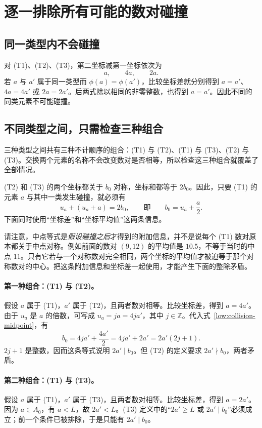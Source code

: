 \documentclass[UTF8,a4paper,oneside,openany,fontset=fandol,zihao=-4]{ctexbook}
\theoremstyle{guide}
\newcommand{\Z}{\mathbb Z}
\begin{document}
\section{逐一排除所有可能的数对碰撞}

\subsection{同一类型内不会碰撞}

对 (T1)、(T2)、(T3)，第二坐标减第一坐标依次为
\[
  a,\qquad 4a,\qquad 2a.
\]
若 $a$ 与 $a'$ 属于同一类型而 $\phi(a)=\phi(a')$，比较坐标差就分别得到 $a=a'$、$4a=4a'$ 或 $2a=2a'$。后两式除以相同的非零整数，也得到 $a=a'$。因此不同的同类元素不可能碰撞。

\subsection{不同类型之间，只需检查三种组合}

三种类型之间共有三种不计顺序的组合：(T1) 与 (T2)、(T1) 与 (T3)、(T2) 与 (T3)。交换两个元素的名称不会改变数对是否相等，所以检查这三种组合就覆盖了全部情况。

(T2) 和 (T3) 的两个坐标都关于 $b_0$ 对称，坐标和都等于 $2b_0$。因此，只要 (T1) 的元素 $a$ 与其中一类发生碰撞，就必须有
\begin{equation}\label{low:collision-midpoint}
  u_a+(u_a+a)=2b_0,
  \qquad\text{即}\qquad b_0=u_a+\frac a2.
\end{equation}
下面同时使用“坐标差”和“坐标平均值”这两条信息。

请注意，中点等式是\emph{假设碰撞之后}才得到的附加信息，并不是说每个 (T1) 数对原本都关于中点对称。例如前面的数对 $(9,12)$ 的平均值是 $10.5$，不等于当时的中点 $11$。只有它若与一个对称数对完全相同，两个坐标的平均值才被迫等于那个对称数对的中心。把这条附加信息和坐标差一起使用，才能产生下面的整除矛盾。

\paragraph{第一种组合：(T1) 与 (T2)。}
假设 $a$ 属于 (T1)，$a'$ 属于 (T2)，且两者数对相等。比较坐标差，得到 $a=4a'$。由于 $u_a$ 是 $a$ 的倍数，可写成 $u_a=ja=4ja'$，其中 $j\in\Z$。代入式~\eqref{low:collision-midpoint}，有
\[
  b_0=4ja'+\frac{4a'}2
     =4ja'+2a'
     =2a'(2j+1).
\]
$2j+1$ 是整数，因而这条等式说明 $2a'\mid b_0$。但 (T2) 的定义要求 $2a'\nmid b_0$，两者矛盾。

\paragraph{第二种组合：(T1) 与 (T3)。}
假设 $a$ 属于 (T1)，$a'$ 属于 (T3)，且两者数对相等。比较坐标差，得到 $a=2a'$。因为 $a\in A_0$，有 $a<L$，故 $2a'<L$。(T3) 定义中的“$2a'\geq L$ 或 $2a'\mid b_0$”必须成立；前一个条件已被排除，于是只能有 $2a'\mid b_0$。
\end{document}

